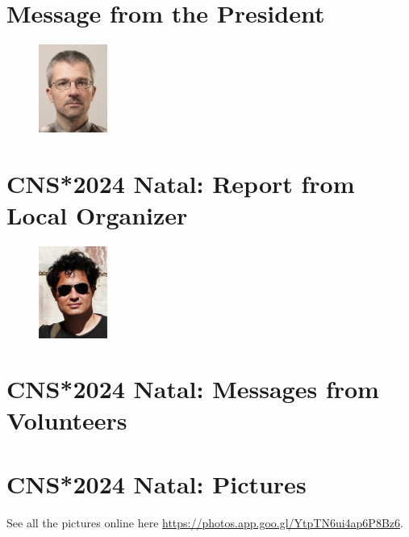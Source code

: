 \documentclass[11pt,a4paper,oneside]{article}
\begin{document}

\clearpage

\pagestyle{fancy}
\fancyhead{}
\fancyfoot{}

\clearpage
\section*{Message from the President}%
\begin{figure}
  \includegraphics[width=0.2\textwidth]{images/Thomas}
\end{figure}

\lipsum[1-3]

\clearpage
\section*{CNS*2024 Natal: Report from Local Organizer}%
\begin{figure}
  \includegraphics[width=0.2\textwidth]{images/Cesar}
\end{figure}

\lipsum[1-3]

\clearpage
\section*{CNS*2024 Natal: Messages from Volunteers}%
\lipsum[1-3]

\clearpage
\section*{CNS*2024 Natal: Pictures}%
\sectionauthor{  }
See all the pictures online here \url{https://photos.app.goo.gl/YtpTN6ui4ap6P8Bz6}.
\end{document}
